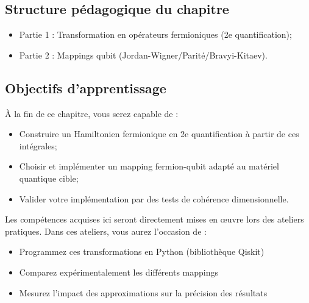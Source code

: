 \documentclass[12pt,a4paper,svgnames,x11names,rgb,table]{article} %
\numberwithin{equation}{section} %
\numberwithin{figure}{section} %
\numberwithin{table}{section} %
\begin{document}
\subsection*{Structure pédagogique du chapitre}
\begin{itemize}[leftmargin=*,nosep]
    \item[\textcolor{blue}{\faArrowCircleRight}] Partie 1 : Transformation en opérateurs fermioniques (2e quantification);
    \item[\textcolor{blue}{\faArrowCircleRight}] Partie 2 : Mappings qubit (Jordan-Wigner/Parité/Bravyi-Kitaev).
\end{itemize}

\subsection*{Objectifs d'apprentissage} 
À la fin de ce chapitre, vous serez capable de :
\begin{itemize}[leftmargin=*]
    \item[\textcolor{green}{\faCheck}] Construire un Hamiltonien fermionique en 2e quantification à partir de ces intégrales;
    \item[\textcolor{green}{\faCheck}] Choisir et implémenter un mapping fermion-qubit adapté au matériel quantique cible;
    \item[\textcolor{green}{\faCheck}] Valider votre implémentation par des tests de cohérence dimensionnelle.
\end{itemize}

\begin{tcolorbox}[colback=blue!5!white,colframe=blue!70,title={À vos simulateurs !},beamer]
Les compétences acquises ici seront directement mises en œuvre lors des ateliers pratiques. Dans ces ateliers, vous aurez l'occasion de :
\begin{itemize}
    \item Programmez ces transformations en Python (bibliothèque Qiskit)
    \item Comparez expérimentalement les différents mappings 
    \item Mesurez l'impact des approximations sur la précision des résultats
\end{itemize}
\end{tcolorbox}
\end{document}
